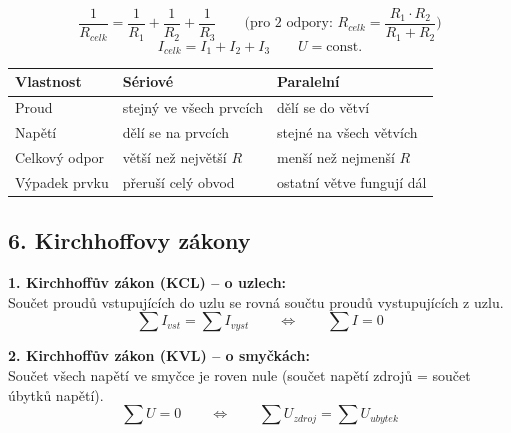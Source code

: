 \documentclass[a4paper,10pt]{article}
\begin{document}
\begin{vysvetlenibox}
\begin{vzorcebox}
\[
\frac{1}{R_{celk}} = \frac{1}{R_1} + \frac{1}{R_2} + \frac{1}{R_3}
\qquad
\text{(pro 2 odpory: } R_{celk} = \frac{R_1 \cdot R_2}{R_1 + R_2} \text{)}
\]
\[
I_{celk} = I_1 + I_2 + I_3
\qquad
U = \text{const.}
\]
\end{vzorcebox}

\begin{center}
\begin{tabularx}{0.85\linewidth}{@{} l X X @{}}
\toprule
\textbf{Vlastnost} & \textbf{Sériové} & \textbf{Paralelní} \\
\midrule
Proud & stejný ve všech prvcích & dělí se do větví \\
Napětí & dělí se na prvcích & stejné na všech větvích \\
Celkový odpor & větší než největší $R$ & menší než nejmenší $R$ \\
Výpadek prvku & přeruší celý obvod & ostatní větve fungují dál \\
\bottomrule
\end{tabularx}
\end{center}

\subsection*{6. Kirchhoffovy zákony}

\begin{durazbox}
\textbf{1. Kirchhoffův zákon (KCL) – o uzlech:}\\
Součet proudů vstupujících do uzlu se rovná součtu proudů vystupujících z uzlu.
\[
\sum I_{vst} = \sum I_{vyst}
\qquad \Leftrightarrow \qquad \sum I = 0
\]

\medskip
\textbf{2. Kirchhoffův zákon (KVL) – o smyčkách:}\\
Součet všech napětí ve smyčce je roven nule (součet napětí zdrojů = součet úbytků napětí).
\[
\sum U = 0
\qquad \Leftrightarrow \qquad \sum U_{zdroj} = \sum U_{ubytek}
\]
\end{durazbox}

\begin{center}
\end{center}


\end{vysvetlenibox}
\end{document}
